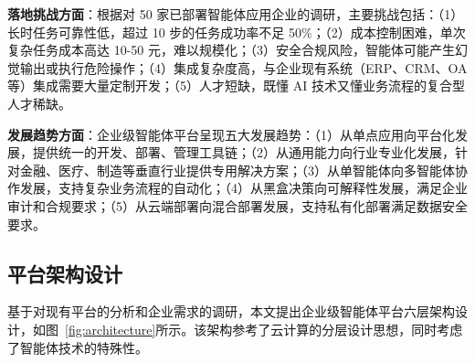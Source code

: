 \documentclass[12pt,a4paper]{article}
\begin{document}
\textbf{落地挑战方面}：根据对 50 家已部署智能体应用企业的调研，主要挑战包括：（1）长时任务可靠性低，超过 10 步的任务成功率不足 50\%；（2）成本控制困难，单次复杂任务成本高达 10-50 元，难以规模化；（3）安全合规风险，智能体可能产生幻觉输出或执行危险操作；（4）集成复杂度高，与企业现有系统（ERP、CRM、OA 等）集成需要大量定制开发；（5）人才短缺，既懂 AI 技术又懂业务流程的复合型人才稀缺。

\textbf{发展趋势方面}：企业级智能体平台呈现五大发展趋势：（1）从单点应用向平台化发展，提供统一的开发、部署、管理工具链；（2）从通用能力向行业专业化发展，针对金融、医疗、制造等垂直行业提供专用解决方案；（3）从单智能体向多智能体协作发展，支持复杂业务流程的自动化；（4）从黑盒决策向可解释性发展，满足企业审计和合规要求；（5）从云端部署向混合部署发展，支持私有化部署满足数据安全要求。

\subsection{平台架构设计}

基于对现有平台的分析和企业需求的调研，本文提出企业级智能体平台六层架构设计，如图~\ref{fig:architecture}所示。该架构参考了云计算的分层设计思想，同时考虑了智能体技术的特殊性。
\end{document}
